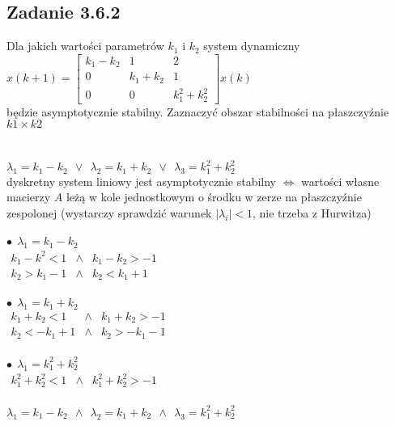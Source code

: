 \subsection*{Zadanie 3.6.2} {\color{darkgray}
	Dla jakich wartości parametrów $k_1$ i $k_2$ system dynamiczny\\
	$x(k+1)=\left[ \begin{array}{ccc}    k_1-k_2 & 1 & 2 \\ 0 & k_1+k_2 & 1 \\ 0 & 0 & k_1^2+k_2^2    \end{array}\right]x(k)$\\
	będzie asymptotycznie stabilny. Zaznaczyć obszar stabilności na płaszczyźnie $k1 \times k2$\\
}\lineh
\\\\
$\lambda_1 = k_1-k_2 \ \ \vee \  \ \lambda_2=k_1+k_2 \ \ \vee \ \ \lambda_3=k_1^2+k_2^2$\\
dyskretny system liniowy jest asymptotycznie stabilny $\Leftrightarrow$ wartości własne macierzy $A$ leżą w kole jednostkowym o środku w zerze na płaszczyźnie zespolonej (wystarczy sprawdzić warunek $|\lambda_i|<1$, nie trzeba z Hurwitza)\\
\\
$\bullet\ \ \lambda_1 = k_1-k_2 $\\
$\begin{array}{ccc}   k_1-k^2<1 & \wedge &k_1-k_2>-1 \\ k_2>k_1-1 & \wedge & k_2<k_1+1    \end{array}$\\
\\
$\bullet\ \ \lambda_1 =k_1+k_2$\\
$\begin{array}{ccc}  k_1+k_2<1 & \wedge & k_1+k_2>-1 \\ k_2<-k_1+1 & \wedge & k_2>-k_1-1    \end{array}$\\
\\
$\bullet\ \ \lambda_1 =k_1^2+k_2^2$\\
$\begin{array}{ccc}  k_1^2+k_2^2<1 &\wedge & k_1^2+k_2^2>-1  \end{array}$\\
\\
$\lambda_1 = k_1-k_2 \ \ \wedge \  \ \lambda_2=k_1+k_2 \ \ \wedge \ \ \lambda_3=k_1^2+k_2^2$\\

